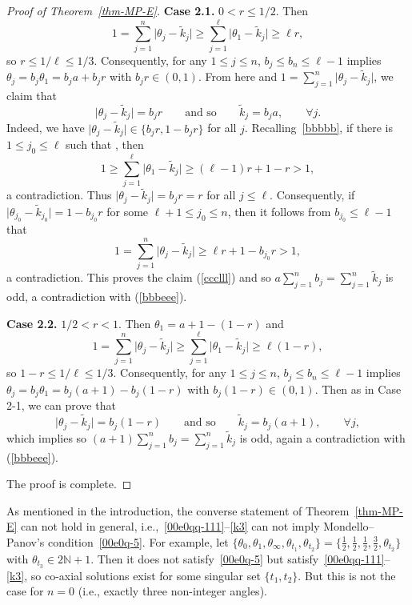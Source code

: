 \documentclass[10pt,a4paper]{amsart}
\numberwithin{equation}{section}
\begin{document}
\begin{proof}[Proof of Theorem~\ref{thm-MP-E}]
{\bf Case 2.1.} $0<r\leq 1/2$. Then
\[1=\sum_{j=1}^n\bigl|\theta_j-\tilde{k}_j\bigr|\geq \sum_{j=1}^\ell\bigl|\theta_1-\tilde{k}_j\bigr|\geq \ell r,\]
so $r\leq 1/\ell\leq 1/3$.
Consequently, for any $1\leq j\leq n$, $b_j\leq b_n\leq \ell-1$ implies
$\theta_j=b_j\theta_1=b_j a+ b_j r$ with $b_j r\in (0,1)$. From here and $1=\sum_{j=1}^n\bigl|\theta_j-\tilde{k}_j\bigr|$, we claim that
\begin{equation} \label{ccclll}
 \bigl|\theta_j-\tilde{k}_j\bigr|=b_jr\qquad\text{and so}\qquad \tilde{k}_j=b_j a,\qquad\forall j.
\end{equation}
Indeed,
we have $\bigl|\theta_j-\tilde{k}_j\bigr|\in \{b_jr, 1-b_jr\}$ for all $j$. Recalling~\eqref{bbbbb}, if there is $1\leq j_0\leq \ell$ such that , then
\[1\geq \sum_{j=1}^\ell\bigl|\theta_1-\tilde{k}_j\bigr|\geq (\ell-1)r+1-r>1,\]
a contradiction. Thus $\bigl|\theta_j-\tilde{k}_j\bigr|=b_jr =r$ for all $j\leq \ell$. Consequently, if $\bigl|\theta_{j_0}-\tilde{k}_{j_0}\bigr|=1-b_{j_0}r$ for some $\ell+1\leq j_0\leq n$, then it follows from $b_{j_0}\leq \ell-1$ that
\[1=\sum_{j=1}^n\bigl|\theta_j-\tilde{k}_j\bigr|\geq \ell r+1-b_{j_0}r>1,\]
a contradiction. This proves the claim (\ref{ccclll}) and so $a\sum_{j=1}^n b_j=\sum_{j=1}^n \tilde{k}_j$ is odd, a contradiction with (\ref{bbbeee}).

{\bf Case 2.2.} $1/2<r<1$. Then $\theta_1=a+1-(1-r)$
and
\[1=\sum_{j=1}^n\bigl|\theta_j-\tilde{k}_j\bigr|\geq \sum_{j=1}^\ell\bigl|\theta_1-\tilde{k}_j\bigr|\geq \ell (1-r),\]
so $1-r\leq 1/\ell\leq 1/3$. Consequently, for any $1\leq j\leq n$, $b_j\leq b_n\leq \ell-1$ implies
$\theta_j=b_j\theta_1=b_j (a+1)-b_j(1-r)$ with $b_j (1-r)\in (0,1)$. Then as in Case 2-1, we can prove that
\[
 \bigl|\theta_j-\tilde{k}_j\bigr|=b_j(1-r)\qquad\text{and so}\qquad \tilde{k}_j=b_j (a+1),\qquad\forall j,
\]
which implies so $(a+1)\sum_{j=1}^n b_j=\sum_{j=1}^n \tilde{k}_j$ is odd, again a contradiction with (\ref{bbbeee}).

The proof is complete.
\end{proof}

As mentioned in the introduction, the converse statement of Theorem~\ref{thm-MP-E} can not hold in general,
i.e.,~\eqref{00e0qq-111}--\eqref{k3} can not imply Mondello--Panov's
condition~\eqref{00e0q-5}. For example, let
$\{\theta_0,\theta_1,\theta_\infty,\theta_{t_1},\allowbreak\theta_{t_2}\}=\bigl\{\frac12,\frac12,\frac12,\frac32,\theta_{t_2}\bigr\}$
with $\theta_{t_3}\in 2\mathbb{N}+1$. Then it does not satisfy~\eqref{00e0q-5} but satisfy~\eqref{00e0qq-111}--\eqref{k3}, so co-axial solutions exist for some singular set $\{t_1, t_2\}$.
But this is not the case for $n=0$ (i.e., exactly three non-integer angles).
\end{document}
